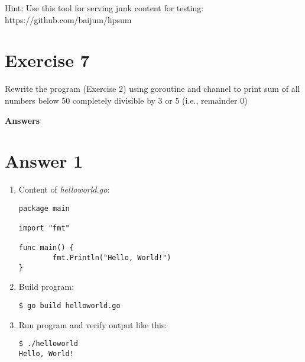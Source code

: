 \documentclass[11pt,a4paper]{article}
\begin{document}
\noindent
Hint: Use this tool for serving junk content for testing:
https://github.com/baijum/lipsum

\section*{Exercise 7}

Rewrite the program (Exercise 2) using goroutine and channel to print
sum of all numbers below 50 completely divisible by 3 or 5 (i.e.,
remainder 0)

\newpage

\centerline{\LARGE\bf Answers}
\section*{Answer 1}

\begin{enumerate}
\item Content of {\it helloworld.go}:
\begin{verbatim}
package main

import "fmt"

func main() {
        fmt.Println("Hello, World!")
}
\end{verbatim}

\item Build program:
\begin{verbatim}
$ go build helloworld.go
\end{verbatim}

\item Run program and verify output like this:
\begin{verbatim}
$ ./helloworld
Hello, World!
\end{verbatim}
\end{enumerate}
\end{document}
